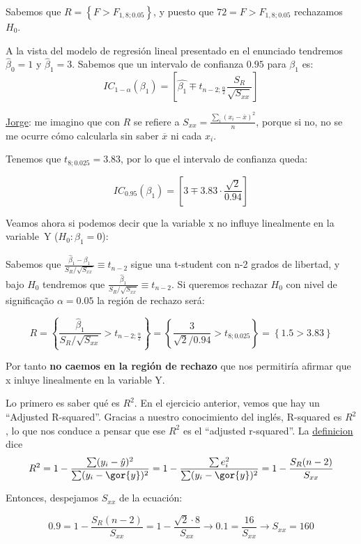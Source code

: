 \begin{problem}[2]
Sabemos que $R=\left\{ F > F_{1,8;0.05} \right\}$, y puesto que $72=F > F_{1,8;0.05}$ rechazamos $H_0$.


A la vista del modelo de regresión lineal presentado en el enunciado tendremos $\hat{β}_0=1$ y $\hat{β}_1=3$. Sabemos que un intervalo de confianza $0.95$ para $β_1$ es:
\[IC_{1-α}(β_1) = \left[ \hat{β_1} \mp t_{n-2;\frac{α}{2}} \frac{S_R}{\sqrt{S_{xx}}} \right]\]

{\color{gray} \underline{Jorge}: me imagino que con $R$ se refiere a $S_{xx} = \frac{\sum_i (x_i - \overline{x})^2}{n}$, porque si no, no se me ocurre cómo calcularla sin saber $\overline{x}$ ni cada $x_i$}.

Tenemos que $t_{8;0.025} = 3.83$, por lo que el intervalo de confianza queda:

\[IC_{0.95}(β_1) = \left[ 3 \mp 3.83 · \frac{\sqrt{2}}{0.94} \right]\]

Veamos ahora si podemos decir que la variable x no influye linealmente en la variable~Y ($H_0: β_1=0$):

Sabemos que $\frac{\hat{β}_1 - β_1}{S_R / \sqrt{S_{xx}}} \equiv t_{n-2}$ sigue una t-student con n-2 grados de libertad, y bajo $H_0$ tendremos que $\frac{\hat{β}_1 }{S_R / \sqrt{S_{xx}}} \equiv t_{n-2}$. Si queremos rechazar $H_0$ con nivel de significação $α=0.05$ la región de rechazo será:

\[R = \left\{ \frac{\hat{β}_1 }{S_R / \sqrt{S_{xx}}} > t_{n-2;\frac{α}{2}} \right\} = \left\{ \frac{3}{\sqrt{2} / 0.94} > t_{8;0.025} \right\} = \left\{ 1.5 > 3.83 \right\}\]

Por tanto \textbf{no caemos en la región de rechazo} que nos permitiría afirmar que x inluye linealmente en la variable Y.


Lo primero es saber qué es $R^2$. En el ejercicio anterior, vemos que hay un ``Adjusted R-squared''. Gracias a nuestro conocimiento del inglés, R-squared es $R^2$, lo que nos conduce a pensar que ese $R^2$ es el ``adjusted r-squared''. La \href{https://en.wikipedia.org/wiki/Coefficient_of_determination}{definicion}  dice 
\[
R^2 = 1 - \frac{\sum (y_i-\hat{y})^2}{\sum (y_i-\gor{y})^2} = 1-\frac{\sum e_i^2}{\sum (y_i-\gor{y})^2} = 1 - \frac{S_R(n-2)}{S_{xx}}
\]

Entonces, despejamos $S_{xx}$ de la ecuación:

\[
0.9 = 1 - \frac{S_R(n-2)}{S_{xx}} = 1 - \frac{\sqrt{2}·8}{S_{xx}} \to 0.1 = \frac{16}{S_{xx}} \to S_{xx} = 160
\]


\end{problem}

